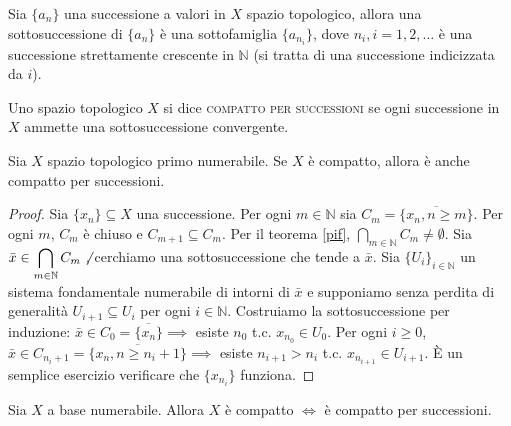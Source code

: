 Sia $\{a_n\}$ una successione a valori in $X$ spazio topologico, allora una sottosuccessione di $\{a_n\}$ è una sottofamiglia $\{a_{n_i}\}$, dove $n_i, i=1, 2, \dots$ è una successione strettamente crescente in $\mathbb{N}$ (si tratta di una successione indicizzata da $i$).

\begin{defn}
  Uno spazio topologico $X$ si dice \textsc{compatto per successioni} se ogni successione in $X$ ammette una sottosuccessione convergente.
\end{defn}

\begin{prop} \label{N1->(c->cs)}
  Sia $X$ spazio topologico primo numerabile. Se $X$ è compatto, allora è anche compatto per successioni.
\end{prop}

\begin{proof}
  Sia $\{x_n\} \subseteq X$ una successione. Per ogni $m \in \mathbb{N}$ sia $C_m=\overline{\{x_n, n \ge m\}}$. Per ogni $m$, $C_m$ è chiuso e $C_{m+1} \subseteq C_m$. Per il teorema \ref{pif}, $\displaystyle \bigcap_{m \in \mathbb{N}} C_m \not=\emptyset$.
  Sia $\displaystyle \bar{x} \in \bigcap_{m \in \mathbb{N}} C_m \not$, cerchiamo una sottosuccessione che tende a $\bar{x}$. Sia $\{U_i\}_{i \in \mathbb{N}}$ un sistema fondamentale numerabile di intorni di $\bar{x}$ e supponiamo senza perdita di generalità $U_{i+1} \subseteq U_i$ per ogni $i \in \mathbb{N}$. Costruiamo la sottosuccessione per induzione:
  $\bar{x} \in C_0=\overline{\{x_n\}} \implies$ esiste $n_0$ t.c. $x_{n_0} \in U_0$. Per ogni $i \ge 0$, $\bar{x} \in C_{n_i+1}=\overline{\{x_n, n \ge n_i+1\}} \implies$ esiste $n_{i+1}>n_i$ t.c.
  $x_{n_{i+1}} \in U_{i+1}$. È un semplice esercizio verificare che $\{x_{n_i}\}$ funziona.
\end{proof}

\begin{thm}
  Sia $X$ a base numerabile. Allora $X$ è compatto $\Leftrightarrow$ è compatto per successioni.
\end{thm}

